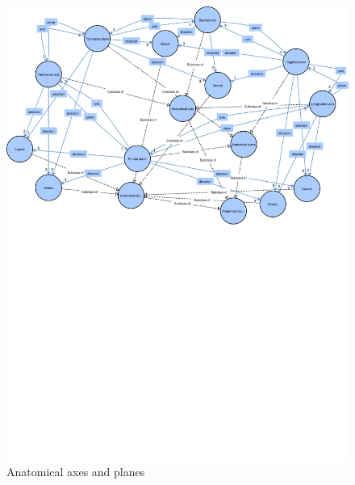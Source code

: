 \documentclass[sw]{iosart2x}
\begin{document}
\begin{figure}[h]
\includegraphics[width=\textwidth]{img/axisplane.pdf}
\caption{Anatomical axes and planes}\label{fig:axisplane}
\end{figure}
\end{document}
